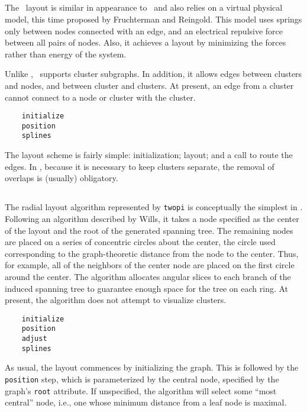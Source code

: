 \subsection{\fdp}
\label{sec:fdp}

The \fdp\ layout is similar in appearance to \neato\ and also relies
on a virtual physical model, this time proposed by Fruchterman and
Reingold\cite{fr}. This model uses springs only between nodes
connected with an edge, and an electrical repulsive force between
all pairs of nodes. Also, it achieves a layout by minimizing the forces
rather than energy of the system.

Unlike \neato, \fdp\ supports cluster subgraphs. In addition, it
allows edges between clusters and nodes, and between cluster and clusters.
At present, an edge from a cluster cannot connect to a node or cluster
with the cluster.

\begin{verbatim}
    initialize
    position
    splines
\end{verbatim}

The layout scheme is fairly simple: initialization; layout; and a call to
route the edges. In \fdp, because it is necessary
to keep clusters separate, the removal of overlaps is (usually)
obligatory.

\subsection{\twopi}
\label{sec:twopi}

The radial layout algorithm represented by {\tt twopi} is conceptually the 
simplest in \gviz. Following an algorithm described by Wills\cite{nicheworks},
it takes a node specified as the center of the layout and the root
of the generated spanning tree. The remaining
nodes are placed on a series of concentric circles about the center,
the circle used corresponding to the graph-theoretic distance from the
node to the center. Thus, for example, all of the neighbors of the
center node are placed on the first circle around the center.
The algorithm allocates angular slices to each branch of the 
induced spanning tree to guarantee enough space for the tree on each ring.
At present, the algorithm does not attempt to visualize clusters.

\begin{verbatim}
    initialize
    position
    adjust
    splines
\end{verbatim}

As usual, the layout commences by initializing the graph.
This is followed by the {\tt position} step, which is parameterized
by the central node, specified by the graph's {\tt root} attribute.
If unspecified, the algorithm will select some
``most central'' node, i.e., one whose minimum distance from a leaf
node is maximal.

